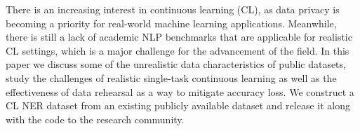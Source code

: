 There is an increasing interest in continuous learning (CL), as data privacy is becoming a priority for real-world machine learning applications. Meanwhile, there is still a lack of academic NLP benchmarks that are applicable for realistic CL settings, which is a major challenge for the advancement of the field. In this paper we discuss some of the unrealistic data characteristics of public datasets, study the challenges of realistic single-task continuous learning as well as the effectiveness of data rehearsal as a way to mitigate accuracy loss. We construct a CL NER dataset from an existing publicly available dataset and release it along with the code to the research community.
